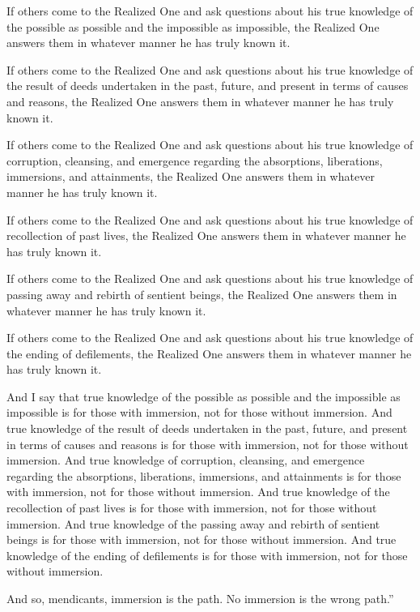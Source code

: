 \documentclass[12pt,openany]{book}%
\begin{document}
If others come to the Realized One and ask questions about his true knowledge of the possible as possible and the impossible as impossible, the Realized One answers them in whatever manner he has truly known it. 

If others come to the Realized One and ask questions about his true knowledge of the result of deeds undertaken in the past, future, and present in terms of causes and reasons, the Realized One answers them in whatever manner he has truly known it. 

If others come to the Realized One and ask questions about his true knowledge of corruption, cleansing, and emergence regarding the absorptions, liberations, immersions, and attainments, the Realized One answers them in whatever manner he has truly known it. 

If others come to the Realized One and ask questions about his true knowledge of recollection of past lives, the Realized One answers them in whatever manner he has truly known it. 

If others come to the Realized One and ask questions about his true knowledge of passing away and rebirth of sentient beings, the Realized One answers them in whatever manner he has truly known it. 

If others come to the Realized One and ask questions about his true knowledge of the ending of defilements, the Realized One answers them in whatever manner he has truly known it. 

And I say that true knowledge of the possible as possible and the impossible as impossible is for those with immersion, not for those without immersion. And true knowledge of the result of deeds undertaken in the past, future, and present in terms of causes and reasons is for those with immersion, not for those without immersion. And true knowledge of corruption, cleansing, and emergence regarding the absorptions, liberations, immersions, and attainments is for those with immersion, not for those without immersion. And true knowledge of the recollection of past lives is for those with immersion, not for those without immersion. And true knowledge of the passing away and rebirth of sentient beings is for those with immersion, not for those without immersion. And true knowledge of the ending of defilements is for those with immersion, not for those without immersion. 

And so, mendicants, immersion is the path. No immersion is the wrong path.” 
\end{document}
